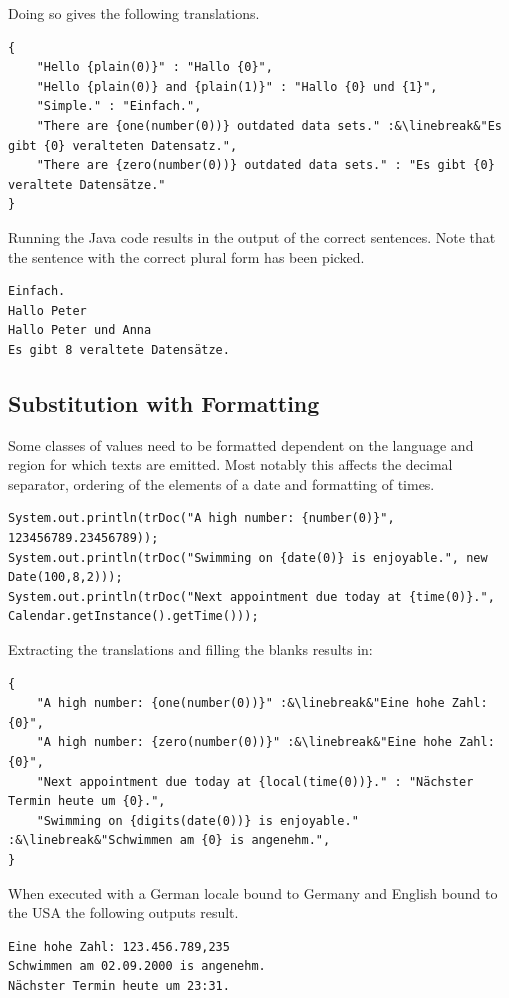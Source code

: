 \documentclass[a4paper,11pt,twoside]{report}
\begin{document}
Doing so gives the following translations.
\begin{lstlisting}[escapechar=\&]
{
	"Hello {plain(0)}" : "Hallo {0}",
	"Hello {plain(0)} and {plain(1)}" : "Hallo {0} und {1}",
	"Simple." : "Einfach.",
	"There are {one(number(0))} outdated data sets." :&\linebreak&"Es gibt {0} veralteten Datensatz.",
	"There are {zero(number(0))} outdated data sets." : "Es gibt {0} veraltete Datensätze."
}
\end{lstlisting}
Running the Java code results in the output of the correct sentences. Note that the sentence with the correct plural form has been picked.
\begin{lstlisting}
Einfach.
Hallo Peter
Hallo Peter und Anna
Es gibt 8 veraltete Datensätze.
\end{lstlisting}

\subsection{Substitution with Formatting}
Some classes of values need to be formatted dependent on the language and region for which texts are emitted. Most notably this affects the decimal separator, ordering of the elements of a date and formatting of times.
\begin{lstlisting}
System.out.println(trDoc("A high number: {number(0)}", 123456789.23456789));
System.out.println(trDoc("Swimming on {date(0)} is enjoyable.", new Date(100,8,2)));
System.out.println(trDoc("Next appointment due today at {time(0)}.", Calendar.getInstance().getTime()));
\end{lstlisting}
Extracting the translations and filling the blanks results in:
\begin{lstlisting}[escapechar=\&]
{
	"A high number: {one(number(0))}" :&\linebreak&"Eine hohe Zahl: {0}",
	"A high number: {zero(number(0))}" :&\linebreak&"Eine hohe Zahl: {0}",
	"Next appointment due today at {local(time(0))}." : "Nächster Termin heute um {0}.",
	"Swimming on {digits(date(0))} is enjoyable." :&\linebreak&"Schwimmen am {0} is angenehm.",
}
\end{lstlisting}
When executed with a German locale bound to Germany and English bound to the \ac{USA} the following outputs result.
\begin{lstlisting}
Eine hohe Zahl: 123.456.789,235
Schwimmen am 02.09.2000 is angenehm.
Nächster Termin heute um 23:31.
\end{lstlisting}
\end{document}
